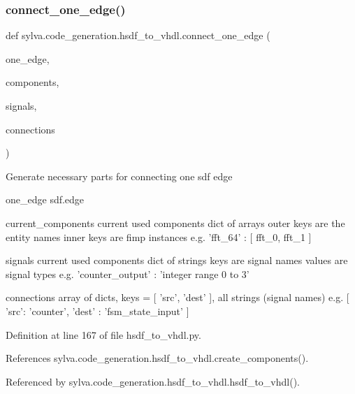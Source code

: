 \subsubsection{\texorpdfstring{connect\+\_\+one\+\_\+edge()}{connect\_one\_edge()}}
{\footnotesize\ttfamily def sylva.\+code\+\_\+generation.\+hsdf\+\_\+to\+\_\+vhdl.\+connect\+\_\+one\+\_\+edge (\begin{DoxyParamCaption}\item[{}]{one\+\_\+edge,  }\item[{}]{components,  }\item[{}]{signals,  }\item[{}]{connections }\end{DoxyParamCaption})}

\begin{DoxyVerb}Generate necessary parts for connecting one sdf edge

  one_edge
    sdf.edge

  current_components
    current used components
    dict of arrays
    outer keys are the entity names
    inner keys are fimp instances
    e.g. { 'fft_64' : [ fft_0, fft_1 ] }

  signals
    current used components
    dict of strings
    keys are signal names
    values are signal types
    e.g. { 'counter_output' : 'integer range 0 to 3' }

  connections
    array of dicts, keys = [ 'src', 'dest' ], all strings (signal names)
    e.g. [ { 'src': 'counter', 'dest' : 'fsm_state_input' } ]
\end{DoxyVerb}
 

Definition at line 167 of file hsdf\+\_\+to\+\_\+vhdl.\+py.



References sylva.\+code\+\_\+generation.\+hsdf\+\_\+to\+\_\+vhdl.\+create\+\_\+components().



Referenced by sylva.\+code\+\_\+generation.\+hsdf\+\_\+to\+\_\+vhdl.\+hsdf\+\_\+to\+\_\+vhdl().


